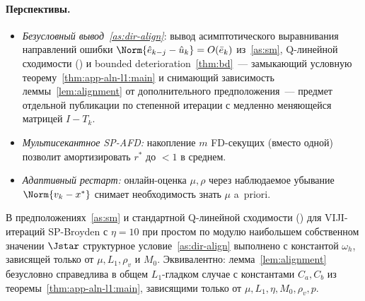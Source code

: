 \paragraph{Перспективы.}
\begin{itemize}
\item \emph{Безусловный вывод~\ref{as:dir-align}}: вывод асимптотического
      выравнивания направлений ошибки $\Norm{\hat e_{k-j} - \hat u_k}
      = O(\bar e_k)$ из~\ref{as:sm}, Q-линейной сходимости
      \textup{(}\cite[Theorem~3.4]{Agafonov2024VIJI}\textup{)}
      и bounded deterioration~\ref{thm:bd}~--- замыкающий условную
      теорему~\ref{thm:app-aln-l1:main} и снимающий зависимость
      леммы~\ref{lem:alignment} от дополнительного предположения~---
      предмет отдельной публикации по степенной итерации с медленно
      меняющейся матрицей $I - T_k$.
\item \emph{Мультисекантное SP-AFD:} накопление $m$ FD-секущих
      (вместо одной) позволит амортизировать $r^{*}$ до $< 1$ в среднем.
\item \emph{Адаптивный рестарт:} онлайн-оценка $\mu, \rho$ через наблюдаемое
      убывание $\Norm{v_k - x^{*}}$ снимает необходимость знать $\mu$ a~priori.
\end{itemize}

\begin{conjecture}
\label{conj:alignment}
В предположениях~\ref{as:sm} и стандартной Q-линейной сходимости
\textup{(}\cite[Theorem~3.4]{Agafonov2024VIJI}\textup{)} для
VIJI-итераций SP-Broyden с $\eta = 10$ при простом по модулю наибольшем
собственном значении $\Jstar$ структурное условие~\ref{as:dir-align}
выполнено с константой $\omega_h$, зависящей только от
$\mu, L_1, \rho_v$ и $M_0$. Эквивалентно: лемма~\ref{lem:alignment}
безусловно справедлива в общем $L_1$-гладком случае с константами
$C_a, C_b$ из теоремы~\ref{thm:app-aln-l1:main}, зависящими только от
$\mu, L_1, \eta, M_0, \rho_v, p$.
\end{conjecture}

